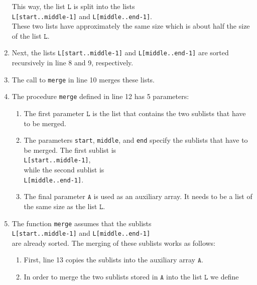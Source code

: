 \begin{enumerate}
      This way, the list $\texttt{L}$ is split into the lists 
      \\[0.2cm]
      \hspace*{1.3cm}
      \texttt{L[start..middle-1]} \quad and \quad \texttt{L[middle..end-1]}.
      \\[0.2cm]
      These two lists have approximately the same size which is about half the size of the list $\texttt{L}$.
\item Next, the lists \texttt{L[start..middle-1]} and \texttt{L[middle..end-1]} are sorted
      recursively in line 8 and 9, respectively.
\item The call to \texttt{merge} in line 10 merges these lists.
\item The procedure \texttt{merge} defined in line 12 has 5 parameters: 
      \begin{enumerate}
      \item The first parameter $\texttt{L}$ is the list that contains the two sublists that have to be merged.
      \item The parameters \texttt{start}, \texttt{middle}, and \texttt{end} specify the sublists
            that have to be merged.  The first sublist is 
            \\[0.2cm]
            \hspace*{1.3cm} 
            \texttt{L[start..middle-1]}, 
            \\[0.2cm]
            while the second sublist is \\[0.2cm]
            \hspace*{1.3cm} 
            \texttt{L[middle..end-1]}. 
      \item The final parameter $\texttt{A}$ is used as an auxiliary array.  It needs to be a list of the
            same size as the list $\texttt{L}$.
      \end{enumerate}
\item The function \texttt{merge} assumes that the sublists 
      \\[0.2cm]
      \hspace*{1.3cm}
      \texttt{L[start..middle-1]} \quad and \quad \texttt{L[middle..end-1]} 
      \\[0.2cm]
      are already sorted.  The merging of these sublists works as follows:
      \begin{enumerate}
      \item First, line 13 copies the sublists into the auxiliary array $\texttt{A}$.
      \item In order to merge the two sublists stored in $\texttt{A}$ into the list $\texttt{L}$ we define

\end{enumerate}
\end{enumerate}
